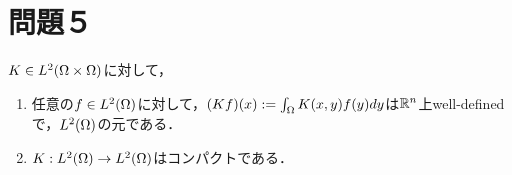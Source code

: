 \documentclass[uplatex,dvipdfmx]{jsarticle}
\begin{document}
\section{問題５}

\begin{tcolorbox}[colframe=ForestGreen, colback=ForestGreen!10!white,breakable,colbacktitle=ForestGreen!40!white,coltitle=black,fonttitle=\bfseries\sffamily,
title=]
    $K\in L^2(\Omega\times\Omega)$に対して，
    \begin{enumerate}
        \item 任意の$f\in L^2(\Omega)$に対して，$(Kf)(x):=\int_\Omega K(x,y)f(y)dy$は$\mathbb{R}^n$上well-definedで，$L^2(\Omega)$の元である．
        \item $K:L^2(\Omega)\to L^2(\Omega)$はコンパクトである．
    \end{enumerate}
\end{tcolorbox}
\end{document}
